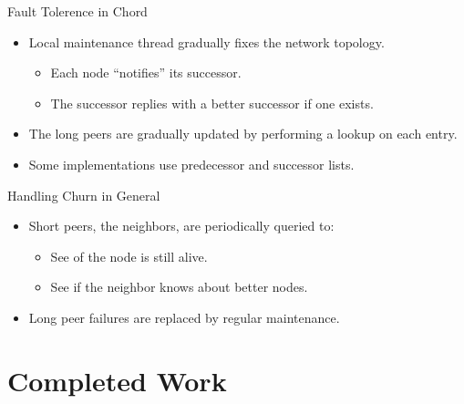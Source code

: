 \documentclass[11pt]{beamer}
\begin{document}
\begin{frame}{Fault Tolerence in Chord}
	\begin{itemize}
		\item Local maintenance thread  gradually fixes the network topology.
		\begin{itemize}
			\item Each node ``notifies'' its successor.
			\item The successor replies with a better successor if one exists.
		\end{itemize}
		\item The long peers are gradually updated by performing a lookup on each entry.
		\item Some implementations use predecessor and successor lists.
	\end{itemize}
\end{frame}



\begin{frame}{Handling Churn in General}
	\begin{itemize}
		\item Short peers, the neighbors, are periodically queried to:
		\begin{itemize}
			\item See of the node is still alive.
			\item See if the neighbor knows about better nodes.
		\end{itemize}
		\item Long peer failures are replaced by regular maintenance.
	\end{itemize}
\end{frame}



\section{Completed Work}
\end{document}
